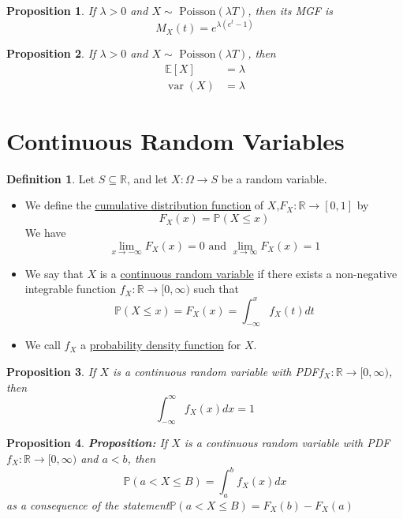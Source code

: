 \documentclass[
]{article}
\newtheorem{proposition}{Proposition}[section]
\theoremstyle{definition}
\newtheorem{definition}{Definition}[section]
\theoremstyle{definition}
\theoremstyle{definition}
\theoremstyle{remark}
\newcommand{\prob}[1]{\mathbb{P}\left(#1\right)}
\newcommand{\fxx}{f_X(x)}
\newcommand{\fx}[1]{f_X(#1)}
\newcommand{\Fxx}{F_X(x)}
\newcommand{\Fx}[1]{F_X(#1)}
\newcommand{\mx}[1]{M_X(#1)}
\newcommand{\R}{\mathbb{R}}
\newcommand{\E}[1]{\mathbb{E}[#1]}
\newcommand{\varx}{\operatorname{var}(X)}
\newcommand{\sse}{\subseteq}
\newcommand{\pssn}[1]{\sim\text{ Poisson}\left( #1 \right)}
\begin{document}
\begin{proposition}
  If $\lambda>0$ and $X\pssn{\lambda T}$, then its MGF is
  \[\mx{t}=e^{\lambda(e^t-1)}\]
\end{proposition}

\begin{proposition}
  If $\lambda>0$ and $X\pssn{\lambda T}$, then
  \begin{align*}
    \E{X} & =\lambda \\
    \varx & =\lambda
  \end{align*}
\end{proposition}

\section{Continuous Random Variables}

\begin{definition}
  Let $S\sse\R$, and let $X:\Omega\to S$ be a random variable.
  \begin{itemize}
    \item We define the \underline{cumulative distribution function} of $X$,\newline $F_X:\R\to[0,1]$ by
          \[\Fxx=\prob{X\leq x}\]
          We have
          \[\lim_{x\to-\infty}\Fxx=0\text{ and }\lim_{x\to\infty}\Fxx=1\]
    \item We say that $X$ is a \underline{continuous random variable} if there exists a non-negative integrable function $f_X:\R\to[0,\infty)$ such that
          \[\prob{X\leq x}=\Fxx=\int_{-\infty}^x\fx{t}dt\]
    \item We call $f_X$ a \underline{probability density function} for $X$.
  \end{itemize}
\end{definition}

\begin{proposition}
  If $X$ is a continuous random variable with PDF\newline $f_X:\R\to[0,\infty)$, then
  \[\int_{-\infty}^\infty \fxx dx=1\]
\end{proposition}

\begin{proposition}
  \textbf{Proposition:} If $X$ is a continuous random variable with PDF\newline $f_X:\R\to[0,\infty)$ and $a<b$, then
  \[\prob{a<X\leq B}=\int_a^b \fxx dx\]
  as a consequence of the statement\quad$\prob{a<X\leq B}=\Fx{b}-\Fx{a}$
\end{proposition}
\end{document}
